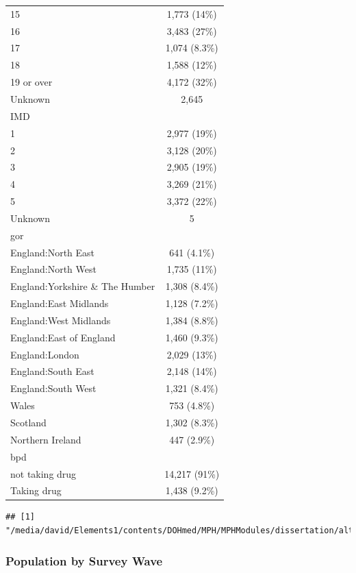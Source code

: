 \documentclass[
]{article}
\begin{document}
\begin{longtable}[]{@{}lc@{}}
15 & 1,773 (14\%) \\
16 & 3,483 (27\%) \\
17 & 1,074 (8.3\%) \\
18 & 1,588 (12\%) \\
19 or over & 4,172 (32\%) \\
Unknown & 2,645 \\
IMD & \\
1 & 2,977 (19\%) \\
2 & 3,128 (20\%) \\
3 & 2,905 (19\%) \\
4 & 3,269 (21\%) \\
5 & 3,372 (22\%) \\
Unknown & 5 \\
gor & \\
England:North East & 641 (4.1\%) \\
England:North West & 1,735 (11\%) \\
England:Yorkshire \& The Humber & 1,308 (8.4\%) \\
England:East Midlands & 1,128 (7.2\%) \\
England:West Midlands & 1,384 (8.8\%) \\
England:East of England & 1,460 (9.3\%) \\
England:London & 2,029 (13\%) \\
England:South East & 2,148 (14\%) \\
England:South West & 1,321 (8.4\%) \\
Wales & 753 (4.8\%) \\
Scotland & 1,302 (8.3\%) \\
Northern Ireland & 447 (2.9\%) \\
bpd & \\
not taking drug & 14,217 (91\%) \\
Taking drug & 1,438 (9.2\%) \\
\bottomrule()
\end{longtable}

\begin{verbatim}
## [1] "/media/david/Elements1/contents/DOHmed/MPH/MPHModules/dissertation/alternativequant/upfnabp/data/table1.png"
\end{verbatim}

\hypertarget{population-by-survey-wave}{%
\subsubsection{Population by Survey
Wave}\label{population-by-survey-wave}}
\end{document}
